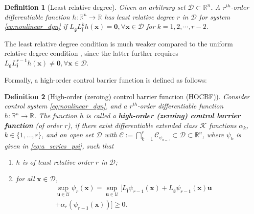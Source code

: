 \documentclass[letterpaper, 10 pt, journal, twoside]{IEEEtran}
\theoremstyle{plain}
\newtheorem{definition}{Definition}
\newcommand{\myvar}[1]{\bm{#1}}
\newcommand{\myset}[1]{\mathscr{#1}}
\begin{document}
\begin{definition}[Least relative degree] \label{def:least_relative_degree} 
Given an arbitrary set $\myset{D}\subset \mathbb{R}^n$. A $r^{th}$-order differentiable function $h: \mathbb{R}^n \to \mathbb{R}$ has \textit{least relative degree} $r$ in $\myset{D}$  for system \eqref{eq:nonlinear_dyn} if $        L_{\mathfrak{g}} L_{\mathfrak{f}}^k h(\myvar{x}) = \myvar{0},  \forall \myvar{x} \in \myset{D} $
for  $k=1,2,\cdots,r-2$.


\end{definition}
The least relative degree condition is much weaker compared to the uniform relative degree condition {\cite{xiao2019control}}, since the  latter further requires  $L_{\mathfrak{g}} L_{\mathfrak{f}}^{r-1} h(\myvar{x}) \neq \myvar{0},  \forall \myvar{x} \in \myset{D}$.



Formally, a high-order control barrier function is defined as follows:

\begin{definition}[High-order (zeroing) control barrier function (HOCBF)] \label{def:high-order control barrier function} 
Consider control system \eqref{eq:nonlinear_dyn}, and  a $r^{th}$-order differentiable function $h: \mathbb{R}^n \to \mathbb{R}$. The function $h$ is called a \textbf{high-order (zeroing) control barrier function} (of order $r$), if there exist differentiable extended class $\mathcal{K}$ functions {$\alpha_{k}$, $k\in \{1,...,r\}$,} and an open set $\myset{D}$ with $ \myset{C}:=\bigcap_{k = 1}^{r} \myset{C}_{\psi_{k-1}}\subset \myset{D} \subset \mathbb{R}^n$, where $\psi_{k}$ is given in \eqref{eq:a_series_psi}, such that
\begin{enumerate}
    \item $h$ is of least relative order $r$ in $\myset{D}$;
    \item    for all $ \myvar{x} \in \myset{D} $,
\begin{multline} \label{eq:condition_HOCBF}
\underset{\myvar{u} \in \myset{U}}{\sup} \psi_r (\myvar{x}) = \underset{\myvar{u} \in \myset{U}}{\sup} [L_{\mathfrak{f}}\psi_{r-1} (\myvar{x}) 
+ L_{\mathfrak{g}} \psi_{r-1}(\myvar{x}) \myvar{u} \\ + \alpha_r(\psi_{r-1}(\myvar{x}))] \geq 0. 
\end{multline} 
\end{enumerate}
\end{definition}
\end{document}
